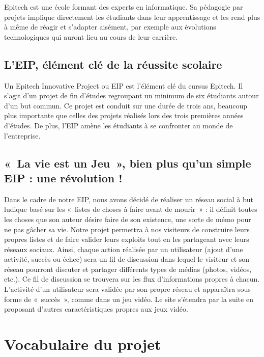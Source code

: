 \documentclass{life-fr}
\begin{document}
Epitech est une école formant des experts en informatique. Sa pédagogie par projets
implique directement les étudiants dans leur apprentissage et les rend plus à même
de réagir et s'adapter aisément, par exemple aux évolutions technologiques qui
auront lieu au cours de leur carrière.

\subsection{L'EIP, élément clé de la réussite scolaire}

Un Epitech Innovative Project ou EIP est l'élément clé du cursus Epitech. Il s'agit d'un projet de fin d'études regroupant un minimum de six étudiants autour d'un but commun. Ce projet est conduit sur une durée de trois ans, beaucoup plus importante que celles des projets réalisés lors des trois premières années d'études. De plus, l'EIP amène les étudiants à se confronter au monde de l'entreprise.

\subsection{«~La vie est un Jeu~», bien plus qu'un simple EIP : une révolution !}

Dans le cadre de notre EIP, nous avons décidé de réaliser un réseau social à but ludique basé sur les «~listes de choses à faire avant de mourir~» : il définit toutes les choses que son auteur désire faire de son existence, une sorte de mémo pour ne pas gâcher sa vie. Notre projet permettra à nos visiteurs de construire leurs propres listes et de faire valider leurs exploits tout en les partageant avec leurs réseaux sociaux. Ainsi, chaque action réalisée par un utilisateur (ajout d'une activité, succès ou échec) sera un fil de discussion dans lequel le visiteur et son réseau pourront discuter et partager différents types de médias (photos, vidéos, etc.). Ce fil de discussion se trouvera sur les flux d'informations propres à chacun. L'activité d'un utilisateur sera validée par son propre réseau et apparaîtra sous forme de «~succès~», comme dans un jeu vidéo. Le site s'étendra par la suite en proposant d'autres caractéristiques propres aux jeux vidéo.


\section{Vocabulaire du projet}
\end{document}
